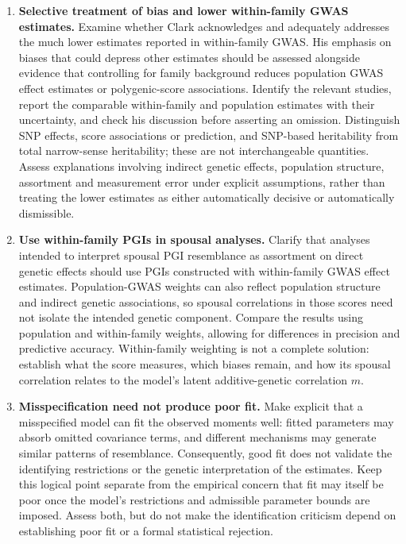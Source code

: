 \documentclass[12pt]{article}
\renewenvironment{itemize}{\begin{enumerate}}{\end{enumerate}}
\begin{document}
\begin{itemize}
\item \textbf{Selective treatment of bias and lower within-family GWAS estimates.}
Examine whether Clark acknowledges and adequately addresses the much
lower estimates reported in within-family GWAS. His emphasis on biases
that could depress other estimates should be assessed alongside evidence
that controlling for family background reduces population GWAS effect
estimates or polygenic-score associations. Identify the relevant studies,
report the comparable within-family and population estimates with their
uncertainty, and check his discussion before asserting an omission.
Distinguish SNP effects, score associations or prediction, and SNP-based
heritability from total narrow-sense heritability; these are not
interchangeable quantities. Assess explanations involving indirect
genetic effects, population structure, assortment and measurement error
under explicit assumptions, rather than treating the lower estimates
as either automatically decisive or automatically dismissible.

\item \textbf{Use within-family PGIs in spousal analyses.}
Clarify that analyses intended to interpret spousal PGI resemblance as
assortment on direct genetic effects should use PGIs constructed with
within-family GWAS effect estimates. Population-GWAS weights can also
reflect population structure and indirect genetic associations, so
spousal correlations in those scores need not isolate the intended
genetic component. Compare the results using population and within-family
weights, allowing for differences in precision and predictive accuracy.
Within-family weighting is not a complete solution: establish what the
score measures, which biases remain, and how its spousal correlation
relates to the model's latent additive-genetic correlation $m$.

\item \textbf{Misspecification need not produce poor fit.}
Make explicit that a misspecified model can fit the observed moments
well: fitted parameters may absorb omitted covariance terms, and
different mechanisms may generate similar patterns of resemblance.
Consequently, good fit does not validate the identifying restrictions
or the genetic interpretation of the estimates. Keep this logical point
separate from the empirical concern that fit may itself be poor once
the model's restrictions and admissible parameter bounds are imposed.
Assess both, but do not make the identification criticism depend on
establishing poor fit or a formal statistical rejection.


\end{itemize}
\end{document}
